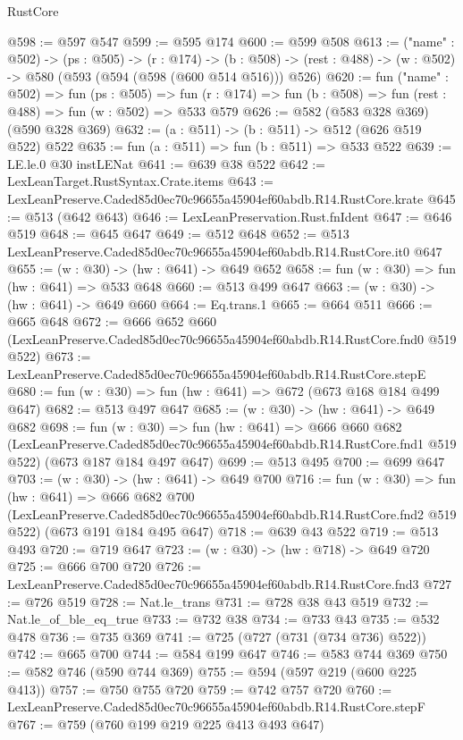 \begin{lexlean}{RustCore}
\begin{coremodule}
@598 := @597 @547
@599 := @595 @174
@600 := @599 @508
@613 := ("name" : @502) ->
  (ps : @505) ->
  (r : @174) ->
  (b : @508) -> (rest : @488) -> (w : @502) -> @580 (@593 (@594 (@598 (@600 @514 @516))) @526)
@620 := fun ("name" : @502) =>
  fun (ps : @505) =>
  fun (r : @174) => fun (b : @508) => fun (rest : @488) => fun (w : @502) => @533 @579
@626 := @582 (@583 @328 @369) (@590 @328 @369)
@632 := (a : @511) -> (b : @511) -> @512 (@626 @519 @522) @522
@635 := fun (a : @511) => fun (b : @511) => @533 @522
@639 := LE.le.{0} @30 instLENat
@641 := @639 @38 @522
@642 := LexLeanTarget.RustSyntax.Crate.items
@643 := LexLeanPreserve.Caded85d0ec70c96655a45904ef60abdb.R14.RustCore.krate
@645 := @513 (@642 @643)
@646 := LexLeanPreservation.Rust.fnIdent
@647 := @646 @519
@648 := @645 @647
@649 := @512 @648
@652 := @513 LexLeanPreserve.Caded85d0ec70c96655a45904ef60abdb.R14.RustCore.it0 @647
@655 := (w : @30) -> (hw : @641) -> @649 @652
@658 := fun (w : @30) => fun (hw : @641) => @533 @648
@660 := @513 @499 @647
@663 := (w : @30) -> (hw : @641) -> @649 @660
@664 := Eq.trans.{1}
@665 := @664 @511
@666 := @665 @648
@672 := @666
    @652
    @660
    (LexLeanPreserve.Caded85d0ec70c96655a45904ef60abdb.R14.RustCore.fnd0 @519 @522)
@673 := LexLeanPreserve.Caded85d0ec70c96655a45904ef60abdb.R14.RustCore.stepE
@680 := fun (w : @30) => fun (hw : @641) => @672 (@673 @168 @184 @499 @647)
@682 := @513 @497 @647
@685 := (w : @30) -> (hw : @641) -> @649 @682
@698 := fun (w : @30) =>
  fun (hw : @641) =>
  @666
    @660
    @682
    (LexLeanPreserve.Caded85d0ec70c96655a45904ef60abdb.R14.RustCore.fnd1 @519 @522)
    (@673 @187 @184 @497 @647)
@699 := @513 @495
@700 := @699 @647
@703 := (w : @30) -> (hw : @641) -> @649 @700
@716 := fun (w : @30) =>
  fun (hw : @641) =>
  @666
    @682
    @700
    (LexLeanPreserve.Caded85d0ec70c96655a45904ef60abdb.R14.RustCore.fnd2 @519 @522)
    (@673 @191 @184 @495 @647)
@718 := @639 @43 @522
@719 := @513 @493
@720 := @719 @647
@723 := (w : @30) -> (hw : @718) -> @649 @720
@725 := @666 @700 @720
@726 := LexLeanPreserve.Caded85d0ec70c96655a45904ef60abdb.R14.RustCore.fnd3
@727 := @726 @519
@728 := Nat.le_trans
@731 := @728 @38 @43 @519
@732 := Nat.le_of_ble_eq_true
@733 := @732 @38
@734 := @733 @43
@735 := @532 @478
@736 := @735 @369
@741 := @725 (@727 (@731 (@734 @736) @522))
@742 := @665 @700
@744 := @584 @199 @647
@746 := @583 @744 @369
@750 := @582 @746 (@590 @744 @369)
@755 := @594 (@597 @219 (@600 @225 @413))
@757 := @750 @755 @720
@759 := @742 @757 @720
@760 := LexLeanPreserve.Caded85d0ec70c96655a45904ef60abdb.R14.RustCore.stepF
@767 := @759 (@760 @199 @219 @225 @413 @493 @647)

\end{coremodule}
\end{lexlean}
